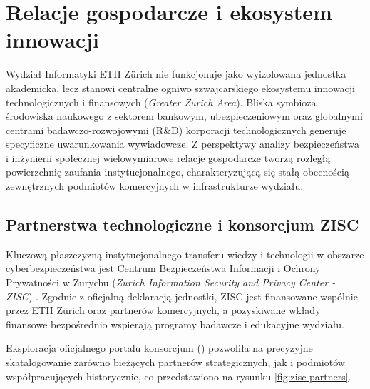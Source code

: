 \section{Relacje gospodarcze i ekosystem innowacji}\label{sec:partnerstwa-gospodarcze}

Wydział Informatyki ETH Zürich nie funkcjonuje jako wyizolowana jednostka akademicka, lecz stanowi centralne ogniwo szwajcarskiego ekosystemu innowacji technologicznych i finansowych (\textit{Greater Zurich Area}). Bliska symbioza środowiska naukowego z sektorem bankowym, ubezpieczeniowym oraz globalnymi centrami badawczo-rozwojowymi (R\&D) korporacji technologicznych generuje specyficzne uwarunkowania wywiadowcze. Z perspektywy analizy bezpieczeństwa i inżynierii społecznej wielowymiarowe relacje gospodarcze tworzą rozległą powierzchnię zaufania instytucjonalnego, charakteryzującą się stałą obecnością zewnętrznych podmiotów komercyjnych w infrastrukturze wydziału.

\subsection{Partnerstwa technologiczne i konsorcjum ZISC}\label{subsec:partnerzy-przemyslowi}

Kluczową płaszczyzną instytucjonalnego transferu wiedzy i technologii w obszarze cyberbezpieczeństwa jest Centrum Bezpieczeństwa Informacji i Ochrony Prywatności w Zurychu (\textit{Zurich Information Security and Privacy Center - ZISC}) \cite{eth_zisc}. Zgodnie z oficjalną deklaracją jednostki, ZISC jest finansowane wspólnie przez ETH Zürich oraz partnerów komercyjnych, a pozyskiwane wkłady finansowe bezpośrednio wspierają programy badawcze i edukacyjne wydziału.

Eksploracja oficjalnego portalu konsorcjum () pozwoliła na precyzyjne skatalogowanie zarówno bieżących partnerów strategicznych, jak i podmiotów współpracujących historycznie, co przedstawiono na rysunku \ref{fig:zisc-partners}.


